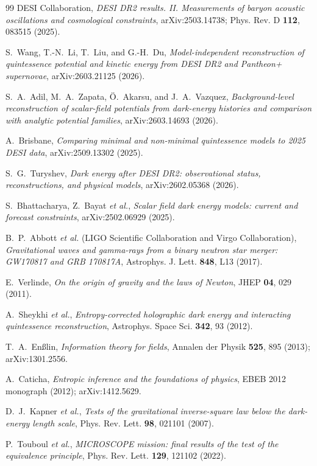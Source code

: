 \documentclass[11pt,reqno]{amsart}
\theoremstyle{plain}
\theoremstyle{definition}
\theoremstyle{remark}
\begin{document}
\begin{thebibliography}{99}
DESI Collaboration,
\emph{DESI DR2 results. II. Measurements of baryon acoustic oscillations and cosmological constraints},
arXiv:2503.14738; Phys. Rev. D \textbf{112}, 083515 (2025).

S.~Wang, T.-N.~Li, T.~Liu, and G.-H.~Du,
\emph{Model-independent reconstruction of quintessence potential and kinetic energy from DESI DR2 and Pantheon+ supernovae},
arXiv:2603.21125 (2026).

S.~A.~Adil, M.~A.~Zapata, \"{O}.~Akarsu, and J.~A.~Vazquez,
\emph{Background-level reconstruction of scalar-field potentials from dark-energy histories and comparison with analytic potential families},
arXiv:2603.14693 (2026).

A.~Brisbane,
\emph{Comparing minimal and non-minimal quintessence models to 2025 DESI data},
arXiv:2509.13302 (2025).

S.~G.~Turyshev,
\emph{Dark energy after DESI DR2: observational status, reconstructions, and physical models},
arXiv:2602.05368 (2026).

S.~Bhattacharya, Z.~Bayat \emph{et al.},
\emph{Scalar field dark energy models: current and forecast constraints},
arXiv:2502.06929 (2025).

B.~P.~Abbott \emph{et al.} (LIGO Scientific Collaboration and Virgo Collaboration),
\emph{Gravitational waves and gamma-rays from a binary neutron star merger: GW170817 and GRB 170817A},
Astrophys. J. Lett. \textbf{848}, L13 (2017).

E.~Verlinde,
\emph{On the origin of gravity and the laws of Newton},
JHEP \textbf{04}, 029 (2011).

A.~Sheykhi \emph{et al.},
\emph{Entropy-corrected holographic dark energy and interacting quintessence reconstruction},
Astrophys. Space Sci. \textbf{342}, 93 (2012).

T.~A.~En{\ss}lin,
\emph{Information theory for fields},
Annalen der Physik \textbf{525}, 895 (2013); arXiv:1301.2556.

A.~Caticha,
\emph{Entropic inference and the foundations of physics},
EBEB 2012 monograph (2012); arXiv:1412.5629.

D.~J.~Kapner \emph{et al.},
\emph{Tests of the gravitational inverse-square law below the dark-energy length scale},
Phys. Rev. Lett. \textbf{98}, 021101 (2007).

P.~Touboul \emph{et al.},
\emph{MICROSCOPE mission: final results of the test of the equivalence principle},
Phys. Rev. Lett. \textbf{129}, 121102 (2022).

\end{thebibliography}
\end{document}
